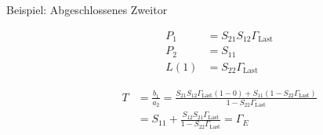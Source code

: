 \begin{description}
\item[Beispiel: Abgeschlossenes Zweitor] \strut

\begin{minipage}[]{0.63\linewidth}
\begin{circuitikz}[scale=1, every node/.style={scale=1}]

\end{circuitikz}
\end{minipage}
\begin{minipage}[]{0.36\linewidth}
\begin{align*}
P_1 &= S_{21}S_{12}\Gamma_\text{Last}\\
P_2 &= S_{11}\\
L(1) &= S_{22} \Gamma_\text{Last}
\end{align*}
\end{minipage}

\begin{align*}
T &= \frac{b_1}{a_2} = \frac{S_{21}S_{12}\Gamma_\text{Last} (1-0) + S_{11} (1-S_{22}\Gamma_\text{Last}) }{1-S_{22}\Gamma_\text{Last} } \\
&= S_{11} + \frac{S_{12} S_{21} \Gamma_\text{Last}}{1 - S_{22} \Gamma_\text{Last}} = \Gamma_E 
\end{align*}
\end{description}